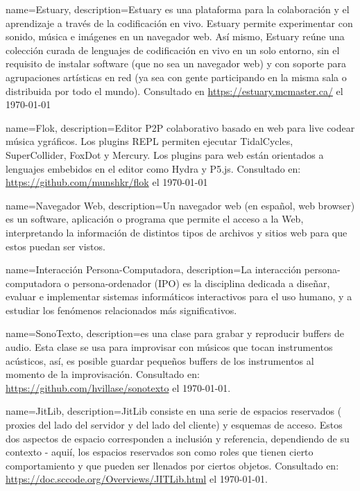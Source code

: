                  {
                   name=Estuary,
    description={Estuary es una plataforma para la colaboración y el aprendizaje a través de la codificación en vivo. Estuary permite experimentar con sonido, música e imágenes en un navegador web. Así mismo, Estuary reúne una colección curada de lenguajes de codificación en vivo en un solo entorno, sin el requisito de instalar software (que no sea un navegador web) y con soporte para agrupaciones artísticas en red (ya sea con gente participando en la misma sala o distribuida por todo el mundo). Consultado en \url{https://estuary.mcmaster.ca/} el \today}}

                 { name=Flok, description={Editor P2P colaborativo basado en web para live codear música ygráficos. Los plugins REPL permiten ejecutar TidalCycles, SuperCollider, FoxDot y Mercury. Los plugins para web están orientados a lenguajes embebidos en el editor como Hydra y P5.js. Consultado en: \url{https://github.com/munshkr/flok} el \today}}

                 {
                   name=Navegador Web,
    description={Un navegador web (en español, web browser) es un software, aplicación o programa que permite el acceso a la Web, interpretando la información de distintos tipos de archivos y sitios web para que estos puedan ser vistos.}}


                 {
                   name=Interacción Persona-Computadora,
    description={La interacción persona-computadora o persona-ordenador (IPO) es la disciplina dedicada a diseñar, evaluar e implementar sistemas informáticos interactivos para el uso humano, y a estudiar los fenómenos relacionados más significativos.}}



                 {
                   name=SonoTexto,
    description={es una clase para grabar y reproducir buffers de audio. Esta clase se usa para improvisar con músicos que tocan instrumentos acústicos, así, es posible guardar pequeños buffers de los instrumentos al momento de la improvisación. Consultado en: \url{https://github.com/hvillase/sonotexto} el \today.}}


                 {
                   name=JitLib,
    description={JitLib consiste en una serie de espacios reservados ( proxies del lado del servidor y del lado del cliente) y esquemas de acceso. Estos dos aspectos de espacio corresponden a inclusión y referencia, dependiendo de su contexto - aquií, los espacios reservados son como roles que tienen cierto comportamiento y que pueden ser llenados por ciertos objetos. Consultado en: \url{https://doc.sccode.org/Overviews/JITLib.html} el \today.}}


